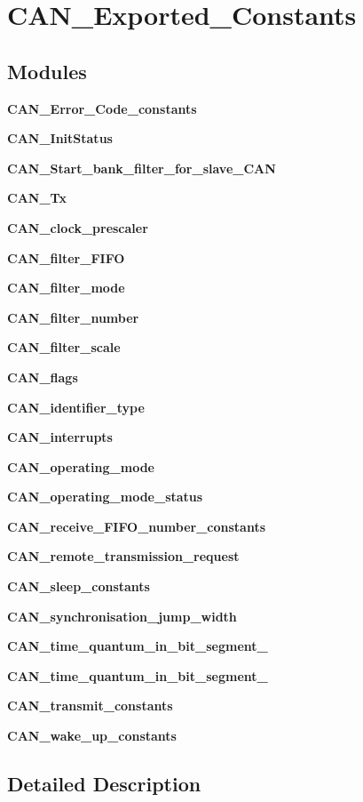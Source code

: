 \section{C\+A\+N\+\_\+\+Exported\+\_\+\+Constants}
\label{group__CAN__Exported__Constants}
\subsection*{Modules}
\begin{DoxyCompactItemize}
\item 
\textbf{ C\+A\+N\+\_\+\+Error\+\_\+\+Code\+\_\+constants}
\item 
\textbf{ C\+A\+N\+\_\+\+Init\+Status}
\item 
\textbf{ C\+A\+N\+\_\+\+Start\+\_\+bank\+\_\+filter\+\_\+for\+\_\+slave\+\_\+\+C\+AN}
\item 
\textbf{ C\+A\+N\+\_\+\+Tx}
\item 
\textbf{ C\+A\+N\+\_\+clock\+\_\+prescaler}
\item 
\textbf{ C\+A\+N\+\_\+filter\+\_\+\+F\+I\+FO}
\item 
\textbf{ C\+A\+N\+\_\+filter\+\_\+mode}
\item 
\textbf{ C\+A\+N\+\_\+filter\+\_\+number}
\item 
\textbf{ C\+A\+N\+\_\+filter\+\_\+scale}
\item 
\textbf{ C\+A\+N\+\_\+flags}
\item 
\textbf{ C\+A\+N\+\_\+identifier\+\_\+type}
\item 
\textbf{ C\+A\+N\+\_\+interrupts}
\item 
\textbf{ C\+A\+N\+\_\+operating\+\_\+mode}
\item 
\textbf{ C\+A\+N\+\_\+operating\+\_\+mode\+\_\+status}
\item 
\textbf{ C\+A\+N\+\_\+receive\+\_\+\+F\+I\+F\+O\+\_\+number\+\_\+constants}
\item 
\textbf{ C\+A\+N\+\_\+remote\+\_\+transmission\+\_\+request}
\item 
\textbf{ C\+A\+N\+\_\+sleep\+\_\+constants}
\item 
\textbf{ C\+A\+N\+\_\+synchronisation\+\_\+jump\+\_\+width}
\item 
\textbf{ C\+A\+N\+\_\+time\+\_\+quantum\+\_\+in\+\_\+bit\+\_\+segment\+\_}
\item 
\textbf{ C\+A\+N\+\_\+time\+\_\+quantum\+\_\+in\+\_\+bit\+\_\+segment\+\_}
\item 
\textbf{ C\+A\+N\+\_\+transmit\+\_\+constants}
\item 
\textbf{ C\+A\+N\+\_\+wake\+\_\+up\+\_\+constants}
\end{DoxyCompactItemize}


\subsection{Detailed Description}
